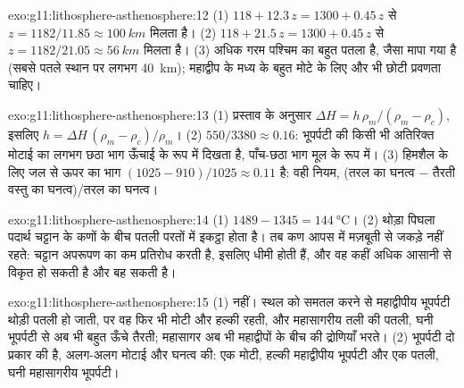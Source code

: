 \begin{solution}{exo:g11:lithosphere-asthenosphere:12}
(1) $118 + 12.3\,z = 1300 + 0.45\,z$ से $z = 1182/11.85 \approx
\qty{100}{km}$ मिलता है। (2) $118 + 21.5\,z = 1300 + 0.45\,z$ से $z = 1182/21.05
\approx \qty{56}{km}$ मिलता है। (3) अधिक गरम पश्चिम का  बहुत पतला है,
जैसा मापा गया है (सबसे पतले स्थान पर लगभग \qty{40}{km}); महाद्वीप के मध्य के बहुत मोटे
 के लिए और भी छोटी प्रवणता चाहिए।
\end{solution}

\begin{solution}{exo:g11:lithosphere-asthenosphere:13}
(1) प्रस्ताव के अनुसार $\Delta H = h\,\rho_m/(\rho_m - \rho_c)$, इसलिए $h =
\Delta H\,(\rho_m - \rho_c)/\rho_m$। (2) $550/3380 \approx 0.16$: भूपर्पटी की किसी भी अतिरिक्त
मोटाई का लगभग छठा भाग ऊँचाई के रूप में दिखता है, पाँच-छठा भाग मूल के रूप में। (3)
हिमशैल के लिए जल से ऊपर का भाग $(1025 - 910)/1025 \approx 0.11$ है:
वही नियम, (तरल का घनत्व $-$ तैरती वस्तु का घनत्व)/तरल का
घनत्व।
\end{solution}

\begin{solution}{exo:g11:lithosphere-asthenosphere:14}
(1) $1489 - 1345 = \qty{144}{\celsius}$। (2) थोड़ा पिघला पदार्थ चट्टान के कणों के बीच
पतली परतों में इकट्ठा होता है। तब कण आपस में मज़बूती से
जकड़े नहीं रहते: चट्टान अपरूपण का कम प्रतिरोध करती है, इसलिए  धीमी होती हैं, और वह
कहीं अधिक आसानी से विकृत हो सकती है और बह सकती है।
\end{solution}

\begin{solution}{exo:g11:lithosphere-asthenosphere:15}
(1) नहीं। स्थल को समतल करने से महाद्वीपीय भूपर्पटी थोड़ी पतली हो जाती,
पर वह फिर भी मोटी और हल्की रहती, और महासागरीय तली की पतली, घनी भूपर्पटी से
अब भी बहुत ऊँचे तैरती; महासागर अब भी
महाद्वीपों के बीच की द्रोणियाँ भरते। (2) भूपर्पटी दो प्रकार की है, अलग-अलग
मोटाई और घनत्व की: एक मोटी, हल्की महाद्वीपीय भूपर्पटी और एक पतली, घनी
महासागरीय भूपर्पटी।
\end{solution}

